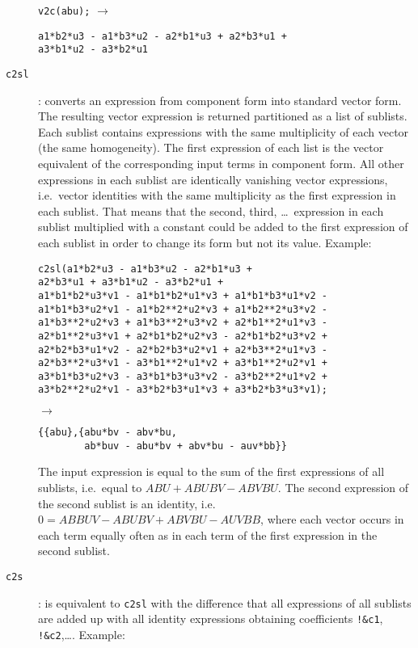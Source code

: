 \begin{description}
  \verb|v2c(abu);| \quad $\longrightarrow$%
\begin{verbatim}
a1*b2*u3 - a1*b3*u2 - a2*b1*u3 + a2*b3*u1 +
a3*b1*u2 - a3*b2*u1
\end{verbatim}
\item[\texttt{c2sl}] : converts an expression from component form into
  standard vector form.  The resulting vector expression is returned
  partitioned as a list of sublists.  Each sublist contains
  expressions with the same multiplicity of each vector (the same
  homogeneity).  The first expression of each list is the vector
  equivalent of the corresponding input terms in component form.  All
  other expressions in each sublist are identically vanishing vector
  expressions, i.e.\ vector identities with the same multiplicity as
  the first expression in each sublist.  That means that the second,
  third, \ldots\ expression in each sublist multiplied with a constant
  could be added to the first expression of each sublist in order to
  change its form but not its value.  Example:
\begin{verbatim}
c2sl(a1*b2*u3 - a1*b3*u2 - a2*b1*u3 +
a2*b3*u1 + a3*b1*u2 - a3*b2*u1 +
a1*b1*b2*u3*v1 - a1*b1*b2*u1*v3 + a1*b1*b3*u1*v2 -
a1*b1*b3*u2*v1 - a1*b2**2*u2*v3 + a1*b2**2*u3*v2 -
a1*b3**2*u2*v3 + a1*b3**2*u3*v2 + a2*b1**2*u1*v3 -
a2*b1**2*u3*v1 + a2*b1*b2*u2*v3 - a2*b1*b2*u3*v2 +
a2*b2*b3*u1*v2 - a2*b2*b3*u2*v1 + a2*b3**2*u1*v3 -
a2*b3**2*u3*v1 - a3*b1**2*u1*v2 + a3*b1**2*u2*v1 +
a3*b1*b3*u2*v3 - a3*b1*b3*u3*v2 - a3*b2**2*u1*v2 +
a3*b2**2*u2*v1 - a3*b2*b3*u1*v3 + a3*b2*b3*u3*v1);
\end{verbatim}
$\longrightarrow$%
\begin{verbatim}
{{abu},{abu*bv - abv*bu,
        ab*buv - abu*bv + abv*bu - auv*bb}}
\end{verbatim}
The input expression is equal to the sum of the first expressions of
  all sublists, i.e.\ equal to $\mathit{ABU} + \mathit{ABU}
  \mathit{BV} - \mathit{ABV} \mathit{BU}$.  The second expression of
  the second sublist is an identity, i.e.\ $0=\mathit{AB} \mathit{BUV}
  - \mathit{ABU} \mathit{BV} + \mathit{ABV} \mathit{BU} - \mathit{AUV}
  \mathit{BB}$, where each vector occurs in each term equally often as
  in each term of the first expression in the second sublist.

\item[\texttt{c2s}] : is equivalent to \texttt{c2sl} with the
  difference that all expressions of all sublists are added up with
  all identity expressions obtaining coefficients \verb|!&c1|,
  \verb|!&c2|,\ldots.  Example:


\end{description}
